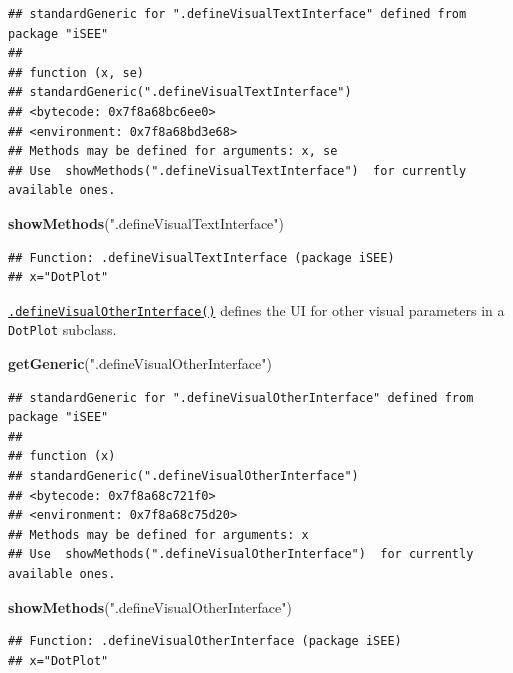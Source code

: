 \documentclass[
]{book}
\newenvironment{Shaded}{\begin{snugshade}}{\end{snugshade}}
\newcommand{\KeywordTok}[1]{\textcolor[rgb]{0.13,0.29,0.53}{\textbf{#1}}}
\newcommand{\NormalTok}[1]{#1}
\newcommand{\StringTok}[1]{\textcolor[rgb]{0.31,0.60,0.02}{#1}}
\begin{document}
\begin{verbatim}
## standardGeneric for ".defineVisualTextInterface" defined from package "iSEE"
## 
## function (x, se) 
## standardGeneric(".defineVisualTextInterface")
## <bytecode: 0x7f8a68bc6ee0>
## <environment: 0x7f8a68bd3e68>
## Methods may be defined for arguments: x, se
## Use  showMethods(".defineVisualTextInterface")  for currently available ones.
\end{verbatim}

\begin{Shaded}
\begin{Highlighting}[]
\KeywordTok{showMethods}\NormalTok{(}\StringTok{".defineVisualTextInterface"}\NormalTok{)}
\end{Highlighting}
\end{Shaded}

\begin{verbatim}
## Function: .defineVisualTextInterface (package iSEE)
## x="DotPlot"
\end{verbatim}

\href{https://isee.github.io/iSEE/reference/visual-parameters-generics.html}{\texttt{.defineVisualOtherInterface()}} defines the UI for other visual parameters in a \texttt{DotPlot} subclass.

\begin{Shaded}
\begin{Highlighting}[]
\KeywordTok{getGeneric}\NormalTok{(}\StringTok{".defineVisualOtherInterface"}\NormalTok{)}
\end{Highlighting}
\end{Shaded}

\begin{verbatim}
## standardGeneric for ".defineVisualOtherInterface" defined from package "iSEE"
## 
## function (x) 
## standardGeneric(".defineVisualOtherInterface")
## <bytecode: 0x7f8a68c721f0>
## <environment: 0x7f8a68c75d20>
## Methods may be defined for arguments: x
## Use  showMethods(".defineVisualOtherInterface")  for currently available ones.
\end{verbatim}

\begin{Shaded}
\begin{Highlighting}[]
\KeywordTok{showMethods}\NormalTok{(}\StringTok{".defineVisualOtherInterface"}\NormalTok{)}
\end{Highlighting}
\end{Shaded}

\begin{verbatim}
## Function: .defineVisualOtherInterface (package iSEE)
## x="DotPlot"
\end{verbatim}
\end{document}
